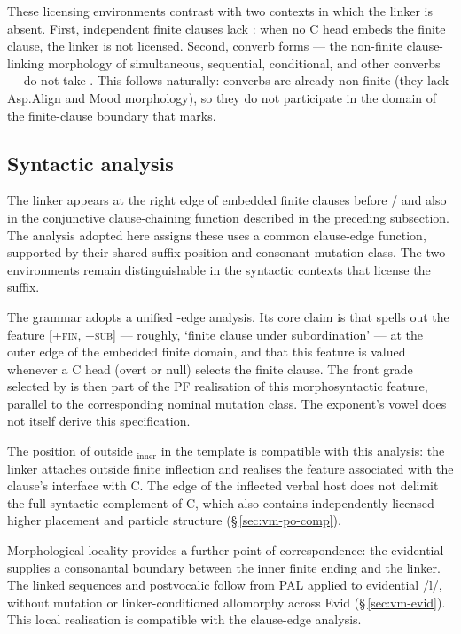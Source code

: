 These licensing environments contrast with two contexts in which the linker
is absent. First, independent finite clauses lack : when no C head embeds the finite clause, the linker
is not licensed. Second, converb forms --- the non-finite clause-linking
morphology of simultaneous, sequential, conditional, and other converbs --- do
not take . This follows naturally: converbs are already non-finite (they
lack Asp.Align and Mood morphology), so they do not participate in the domain of
the finite-clause boundary that  marks.

\subsection{Syntactic analysis}
\label{sec:vm-tension-linker}

The linker  appears at the right edge of embedded finite clauses before
/ and also in the conjunctive clause-chaining function
described in the preceding subsection. The analysis adopted here assigns these
uses a common clause-edge function, supported by their shared suffix position and
consonant-mutation class. The two environments remain distinguishable
in the syntactic contexts that license the suffix.

The grammar adopts a unified -edge analysis.
Its core claim is that  spells out the feature \textsc{[+fin, +sub]} ---
roughly, `finite clause under subordination' --- at the outer edge of the
embedded finite domain, and that this feature is valued whenever a C head
(overt or null) selects the finite clause. The front grade selected by
 is then part of the PF realisation of this morphosyntactic feature,
parallel to the corresponding nominal mutation class. The exponent's vowel
does not itself derive this specification.

The position of  outside $_\text{inner}$ in the template
is compatible with this analysis: the linker attaches outside finite
inflection and realises the feature associated with the clause's interface
with C. The edge of the inflected verbal host does not delimit the full
syntactic complement of C, which also contains independently licensed higher
placement and particle structure (§\,\ref{sec:vm-po-comp}).

Morphological locality provides a further point of correspondence: the
evidential supplies a consonantal boundary between the inner finite ending
and the linker. The linked sequences  and
postvocalic  follow from PAL applied to evidential /l/,
without mutation or linker-conditioned allomorphy across Evid
(§\,\ref{sec:vm-evid}). This local realisation is compatible with the clause-edge analysis.

